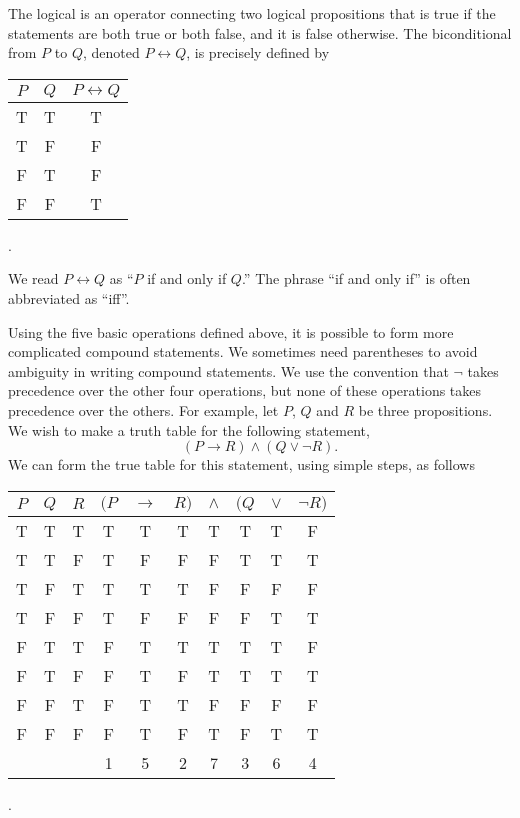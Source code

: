 The logical  is an operator connecting two logical propositions that is true if the statements are both true or both false, and it is false otherwise.
The biconditional from $P$ to $Q$, denoted $P \leftrightarrow Q$, is precisely defined by
\begin{center}
\begin{tabular}{|c|c|c|}
\hline
$P$ & $Q$ & $P \leftrightarrow Q$ \tabularnewline
\hline
T & T & T \tabularnewline
T & F & F \tabularnewline
F & T & F \tabularnewline
F & F & T \tabularnewline
\hline
\end{tabular} .
\end{center}
We read $P \leftrightarrow Q$ as ``$P$ if and only if $Q$.''
The phrase ``if and only if'' is often abbreviated as ``iff''.

Using the five basic operations defined above, it is possible to form more complicated compound statements.
We sometimes need parentheses to avoid ambiguity in writing compound statements.
We use the convention that $\neg$ takes precedence over the other four operations, but none of these operations takes precedence over the others.
For example, let $P$, $Q$ and $R$ be three propositions.
We wish to make a truth table for the following statement,
\begin{equation} \label{equation:LogicStatement}
(P \rightarrow R) \wedge (Q \vee \neg R) .
\end{equation}
We can form the true table for this statement, using simple steps, as follows
\begin{center}
\begin{tabular}{|c|c|c|c:c:c:c:c:c:c|}
\hline
$P$ & $Q$ & $R$
& $(P$ & $\rightarrow$ & $R)$ & $\wedge$ & $(Q$ & $\vee$ & $\neg R)$ \tabularnewline
\hline
T & T & T & T & T & T & T & T & T & F \tabularnewline
T & T & F & T & F & F & F & T & T & T \tabularnewline
T & F & T & T & T & T & F & F & F & F \tabularnewline
T & F & F & T & F & F & F & F & T & T \tabularnewline
F & T & T & F & T & T & T & T & T & F \tabularnewline
F & T & F & F & T & F & T & T & T & T \tabularnewline
F & F & T & F & T & T & F & F & F & F \tabularnewline
F & F & F & F & T & F & T & F & T & T \tabularnewline
& & & 1 & 5 & 2 & 7 & 3 & 6 & 4 \tabularnewline
\hline
\end{tabular} .
\end{center}

